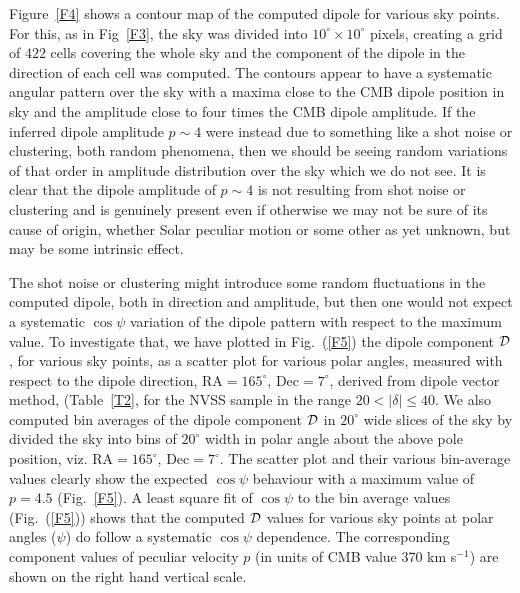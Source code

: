 \documentclass[fleqn,usenatbib]{mnras}
\begin{document}
Figure~\ref{F4} shows a contour map of the computed dipole for various sky points. For this, as in Fig~\ref{F3}, the sky was divided into $10^\circ \times 10^\circ$ pixels, creating a grid of $422$ cells covering the whole sky and the component of the dipole in the direction of each cell was computed. The contours appear to have a systematic angular pattern over the sky with a maxima close to the CMB dipole position in sky and the amplitude close to four times the CMB dipole amplitude. If the inferred dipole amplitude $p \sim 4$ were instead due to something like a shot noise or clustering, both random phenomena, then we should be seeing random variations of that order in amplitude distribution over the sky which we do not see. It is clear that the dipole amplitude of $p \sim 4$ is not resulting from shot noise or clustering and is genuinely present even if otherwise we may not be sure of its cause of origin, whether Solar peculiar motion or some other as yet unknown, but may be some intrinsic effect.

The shot noise or clustering might introduce some random fluctuations in the computed dipole, both in direction and amplitude, but then one would not expect a systematic $\cos \psi$ variation of the dipole pattern with respect to the maximum value. To investigate that, we have plotted in Fig.~(\ref{F5}) the dipole component ${\cal D}$, for various sky points, as a scatter plot for various polar angles, measured with respect to the dipole direction,  RA$=165^{\circ}$, Dec$=7^{\circ}$, derived from dipole vector method, (Table~\ref{T2}, for the NVSS sample in the range $20<|{\delta}|\leq40$. 
We also computed bin averages of the dipole component ${\cal D}$ in $20^{\circ}$ wide slices of the sky by divided the sky into bins of $20^\circ$ width in polar angle about the above pole position, viz. RA$=165^{\circ}$, Dec$=7^{\circ}$. The scatter plot and their various bin-average values clearly show the expected $\cos\psi$ behaviour with a maximum value of $p=4.5$ (Fig.~\ref{F5}). 
A least square fit of $\cos \psi$ to the bin average values (Fig.~(\ref{F5})) shows that the computed ${\cal D}$ values for various sky points at polar angles ($\psi$) do follow a systematic $\cos\psi$ dependence. 
The corresponding component values of peculiar velocity $p$ (in units of CMB value 370 km s$^{-1}$) are shown on the right hand vertical scale.
\end{document}
